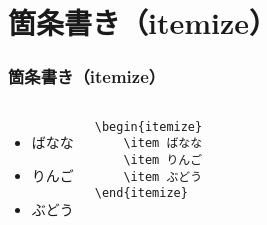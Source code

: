 \section{箇条書き（itemize）}
\begin{frame}[fragile]
    \frametitle{箇条書き（itemize）}
    \begin{columns}
        \begin{itemize}
            \item ばなな
            \item りんご
            \item ぶどう
        \end{itemize}
        \begin{verbatim}
\begin{itemize}
    \item ばなな
    \item りんご
    \item ぶどう
\end{itemize}
        \end{verbatim}
    \end{columns}
\end{frame}
